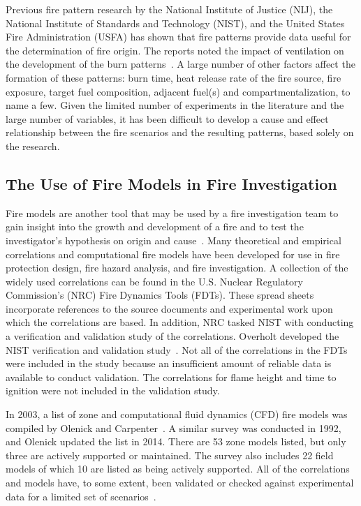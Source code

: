 \documentclass[twoside]{uocthesis}
\begin{document}
Previous fire pattern research by the National Institute of Justice (NIJ), the National Institute of Standards and Technology (NIST), and the United States Fire Administration (USFA) has shown that fire patterns provide data useful for the determination of fire origin.  The reports noted the impact of ventilation on the development of the burn patterns~\cite{Shanley:1997,Putorti:1997}. A large number of other factors affect the formation of these patterns: burn time, heat release rate of the fire source, fire exposure, target fuel composition, adjacent fuel(s) and compartmentalization, to name a few. Given the limited number of experiments in the literature and the large number of variables, it has been difficult to develop a cause and effect relationship between the fire scenarios and the resulting patterns, based solely on the research.  


\subsection{The Use of Fire Models in Fire Investigation}
Fire models are another tool that may be used by a fire investigation team to gain insight into the growth and development of a fire and to test the investigator’s hypothesis on origin and cause~\cite{Sutula:2001}.  Many theoretical and empirical correlations and computational fire models have been developed for use in fire protection design, fire hazard analysis, and fire investigation.  A collection of the widely used correlations can be found in the U.S. Nuclear Regulatory Commission’s (NRC) Fire Dynamics Tools (FDTs). These spread sheets incorporate references to the source documents and experimental work upon which the correlations are based. In addition, NRC tasked NIST with conducting a verification and validation study of the correlations. Overholt developed the NIST verification and validation study~\cite{Overholt:2014}. Not all of the correlations in the FDTs were included in the study because an insufficient amount of reliable data is available to conduct validation.  The correlations for flame height and time to ignition were not included in the validation study.

In 2003, a list of zone and computational fluid dynamics (CFD) fire models was compiled by Olenick and Carpenter~\cite{Olenick:2003}. A similar survey was conducted in 1992, and Olenick updated the list in 2014. There are 53 zone models listed, but only three are actively supported or maintained.  The survey also includes 22 field models of which 10 are listed as being actively supported.  All of the correlations and models have, to some extent, been validated or checked against experimental data for a limited set of scenarios~\cite{ASTM_E1355}.
\end{document}

